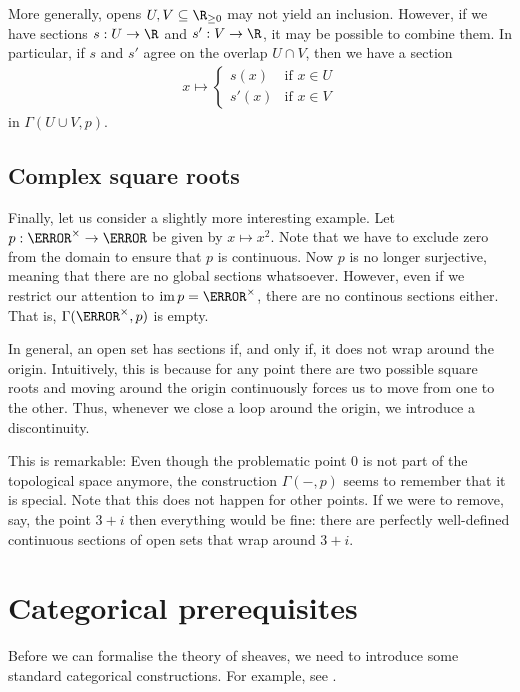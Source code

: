 \documentclass{article}
\begin{document}
More generally, opens $U,V\subseteq\R_{\geq 0}$ may not yield an
inclusion. However, if we have sections $s:U\to\R$ and $s':V\to\R$,
it may be possible to combine them. In particular, if $s$ and $s'$
agree on the overlap $U\cap V$, then we have a section
\begin{align*}
  x \mapsto \begin{cases}
    s(x) & \text{if }x\in U \\
    s'(x) & \text{if }x\in V
  \end{cases}
\end{align*}
in $\Gamma(U\cup V,p)$.

\subsection{Complex square roots}

Finally, let us consider a slightly more interesting example.
Let $p:\C^\times\to\C$ be given by $x\mapsto x^2$. Note that we
have to exclude zero from the domain to ensure that $p$ is continuous.
Now $p$ is no longer surjective, meaning that there are no global
sections whatsoever. However, even if we restrict our attention
to $\im p =\C^\times$, there are no continous sections either. That is,
$\Gamma(\C^\times,p)$ is empty.

In general, an open set has sections if, and only if, it does not wrap
around the origin. Intuitively, this is because for any point there are
two possible square roots and moving around the origin continuously
forces us to move from one to the other. Thus, whenever we close a loop
around the origin, we introduce a discontinuity.

This is remarkable: Even though the problematic point $0$ is not part
of the topological space anymore, the construction $\Gamma(-,p)$
seems to remember that it is special. Note that this does not happen
for other points. If we were to remove, say, the point $3+i$ then
everything would be fine: there are perfectly well-defined continuous
sections of open sets that wrap around $3+i$.

\section{Categorical prerequisites}\label{sec:categories_and_functors}

Before we can formalise the theory of sheaves, we need to introduce some
standard categorical constructions. For example, see \cite{maclane1997}.
\end{document}
